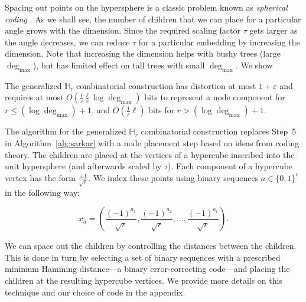 Spacing out points on the hypersphere is a classic problem known as \emph{spherical coding} \cite{Spheres}. As we shall see, the number of children that we can place for a particular angle grows with the dimension. Since the required scaling factor $\tau$ gets larger as the angle decreases, we can reduce $\tau$ for a particular embedding by increasing the dimension. Note that increasing the dimension helps with bushy trees (large $\operatorname{deg}_{\max}$), but has limited effect on tall trees with small $\operatorname{deg}_{\max}$. We show



\begin{proposition} The generalized $\mathbb{H}_r$ combinatorial construction has distortion at most $1+\varepsilon$ and requires at most $O(\frac{1}{\varepsilon}\frac{\ell}{r} \log \operatorname{deg}_{\max})$ bits to represent a node component for $r \leq (\log \operatorname{deg}_{\max})+1$, and $O(\frac{1 }{\varepsilon}\ell)$ bits for $r > (\log \operatorname{deg}_{\max})+1$. 
\end{proposition}

The algorithm for the generalized $\mathbb{H}_r$ combinatorial construction replaces Step~5 in Algorithm~\ref{alg:sarkar} with a node placement step based on ideas from coding theory. The children are placed at the vertices of a hypercube inscribed into the unit hypersphere (and afterwards scaled by $\tau$). Each component of a hypercube vertex has the form $\frac{\pm 1}{\sqrt{r}}$. We index these points using binary sequences ${a} \in \{0,1\}^r$ in the following way:

\[{x}_{ a} = \left( \frac{(-1)^{a_1}}{\sqrt{r}}, \frac{(-1)^{a_2}}{\sqrt{r}} , \ldots, \frac{(-1)^{a_r}}{\sqrt{r}} \right).\]

We can space out the children by controlling the distances between the children. This is done in turn by selecting a set of binary sequences with a prescribed minimum Hamming distance---a binary error-correcting code---and placing the children at the resulting hypercube vertices. We provide more details on this technique and our choice of code in the appendix.

